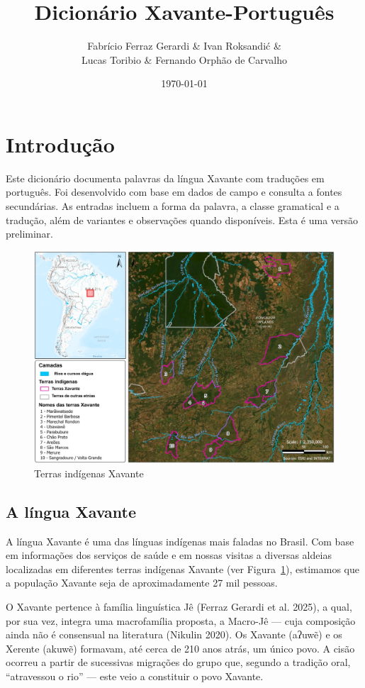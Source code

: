 \documentclass[12pt]{book}
\title{\textbf{Dicionário Xavante-Português}}
\author{Fabrício Ferraz Gerardi \& Ivan Roksandić \& \\ Lucas Toribio \& Fernando Orphão de Carvalho}
\date{\today}
\begin{document}
\frontmatter
\maketitle


\chapter*{Introdução}

Este dicionário documenta palavras da língua Xavante com traduções em português. Foi desenvolvido com base em dados de campo e consulta a fontes secundárias. As entradas incluem a forma da palavra, a classe gramatical e a tradução, além de variantes e observações quando disponíveis. Esta é uma versão preliminar.


\begin{figure}
    \centering
    \includegraphics[width=0.7\linewidth]{XavanteTerras.jpeg}
    \caption{Terras indígenas Xavante}
    \label{fig:XavTerras}
\end{figure}

\section*{A língua Xavante}

A língua Xavante é uma das línguas indígenas mais faladas no Brasil. Com base em informações dos serviços de saúde e em nossas visitas a diversas aldeias localizadas em diferentes terras indígenas Xavante (ver Figura~\ref{fig:XavTerras}), estimamos que a população Xavante seja de aproximadamente 27 mil pessoas.

O Xavante pertence à família linguística Jê (Ferraz Gerardi et al. 2025), a qual, por sua vez, integra uma macrofamília proposta, a Macro-Jê — cuja composição ainda não é consensual na literatura (Nikulin 2020). Os Xavante (aʔuwẽ) e os Xerente (akuwẽ) formavam, até cerca de 210 anos atrás, um único povo. A cisão ocorreu a partir de sucessivas migrações do grupo que, segundo a tradição oral, “atravessou o rio” — este veio a constituir o povo Xavante.
\end{document}
